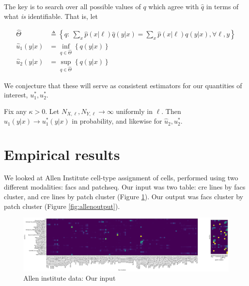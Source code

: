 The key is to search over all possible values of $q$ which agree with $\hat q$ in terms of what \emph{is} identifiable. That is, let 

\begin{align*}
\hat\Theta &\triangleq\left\{q:\ \sum_x \hat p(x|\ell)\hat q(y|x) =\sum_x \hat p(x|\ell)q(y|x), \forall \ell,y\right\}\\ 
\hat u_1(y|x) &= \inf_{q\in\hat\Theta} \left\{q(y|x) \right\} \\
\hat u_2(y|x) &= \sup_{q\in\hat\Theta} \left\{q(y|x) \right\}
\end{align*}

We conjecture that these will serve as consistent estimators for our quantities of interest, $u_1^*,u_2^*$.\vspace{.1in}

\vspace{.1in}
\begin{conj}
Fix any $\kappa>0$.  Let $N_{X,\ell},N_{Y,\ell}\rightarrow\infty$ uniformly in $\ell$.  Then $\hat u_1(y|x)\rightarrow u^*_1(y|x)$ in probability, and likewise for $\hat u_2,u^*_2$.
\end{conj}

\section{Empirical results}

We looked at Allen Institute cell-type assignment of cells, performed using two different modalities: facs and patchseq.  Our input was two table: cre lines by facs cluster, and cre lines by patch cluster (Figure \ref{fig:alleninput}).  Our output was facs cluster by patch cluster (Figure \ref{fig:allenoutput}).

\begin{figure}
\includegraphics[width=.9\textheight,angle=270]{pics/alleninput}
\caption{Allen institute data: Our input \label{fig:alleninput}}
\end{figure}


